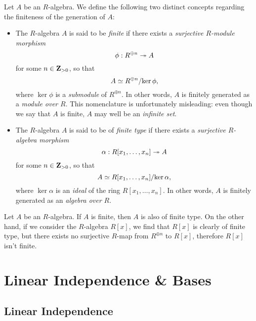 \begin{definition}
\label{def:finite-generation-algebras}
Let \(A\) be an \(R\)-algebra. We define the following two distinct concepts
regarding the finiteness of the generation of \(A\):
\begin{itemize}[(a)]\setlength\itemsep{0em}
\item The \(R\)-algebra \(A\) is said to be \emph{finite} if there exists a
  \emph{surjective \(R\)-module morphism}
  \[
  \phi: R^{\oplus n} \twoheadrightarrow A
  \]
  for some \(n \in \mathbf{Z}_{>0}\), so that
  \[
  A \simeq R^{\oplus n}/{\ker \phi},
  \]
  where \(\ker \phi\) is a \emph{submodule} of \(R^{\oplus n}\). In other words,
  \(A\) is finitely generated as a \emph{module over \(R\)}. This nomenclature
  is unfortunately misleading: even though we say that \(A\) is finite, \(A\) may
  well be an \emph{infinite set}.

\item The \(R\)-algebra \(A\) is said to be of \emph{finite type} if there
  exists a \emph{surjective \(R\)-algebra morphism}
  \[
  \alpha: R[x_1, \dots, x_n] \twoheadrightarrow A
  \]
  for some \(n \in \mathbf{Z}_{>0}\), so that
  \[
  A \simeq R[x_1, \dots, x_n]/{\ker \alpha},
  \]
  where \(\ker \alpha\) is an \emph{ideal} of the ring \(R[x_1, \dots,
  x_n]\). In other words, \(A\) is finitely generated as an \emph{algebra over
    \(R\)}.
\end{itemize}
\end{definition}

\begin{remark}
\label{rem:finite-type-not-finite}
Let \(A\) be an \(R\)-algebra. If \(A\) is finite, then \(A\) is also of finite
type. On the other hand, if we consider the \(R\)-algebra \(R[x]\), we find that
\(R[x]\) is clearly of finite type, but there exists no surjective \(R\)-map
from \(R^{\oplus n}\) to \(R[x]\), therefore \(R[x]\) isn't finite.
\end{remark}

\section{Linear Independence \& Bases}

\subsection{Linear Independence}

